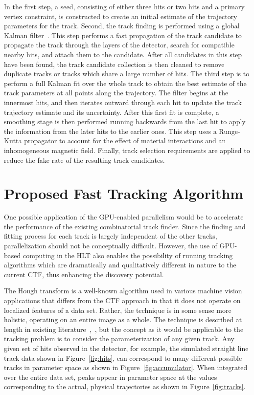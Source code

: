 \documentclass{JINST}
\begin{document}
In the first step, a seed, consisting of either three hits or two hits and a primary vertex constraint,
is constructed to create an initial estimate of the trajectory parameters for the track. Second, the
track finding is performed using a global Kalman filter~\cite{Fruhwirth:1987fm}. This step performs a fast
propagation of the track candidate to propagate the track through the layers of the detector, search for
compatible nearby hits, and attach them to the candidate. After all candidates in this step have been
found, the track candidate collection is then cleaned to remove duplicate tracks or tracks which share a
large number of hits.  The third step is to perform a full Kalman fit over the whole track to obtain the
best estimate of the track parameters at all points along the trajectory. The filter begins at the
innermost hits, and then iterates outward through each hit to update the track trajectory estimate and
its uncertainty. After this first fit is complete, a smoothing stage is then performed running backwards
from the last hit to apply the information from the later hits to the earlier ones. This step uses a
Runge-Kutta propagator to account for the effect of material interactions and an inhomogeneous magnetic
field. Finally, track selection requirements are applied to reduce the fake rate of the resulting track
candidates.



\section{Proposed Fast Tracking Algorithm}

One possible application of the GPU-enabled parallelism would be to accelerate the performance of the
existing combinatorial track finder.  Since the finding and fitting process for each track is largely
independent of the other tracks, parallelization should not be conceptually difficult. However, the use
of GPU-based computing in the HLT also enables the possibility of running tracking algorithms which are
dramatically and qualitatively different in nature to the current CTF, thus enhancing the discovery potential.

 The Hough transform is a well-known algorithm used in various machine
vision applications that differs from the CTF approach in that it does not operate on
localized features of a data set.  Rather, the technique is in some sense more
holistic, operating on an entire image as a whole. 
The technique is described at length in existing literature~\cite{bib:HT1},~\cite{bib:HT2},
but the concept as it would be applicable to the
tracking problem is to consider the parameterization of any given track.  Any given set of hits
observed in the detector, for example, the simulated straight line track data shown in Figure~\ref{fig:hits},
can correspond to many different possible tracks in parameter space as shown in Figure~\ref{fig:accumulator}.
When integrated over the entire data set, peaks appear in parameter space at the values corresponding to the actual, 
physical trajectories as shown in Figure~\ref{fig:tracks}.
\end{document}

